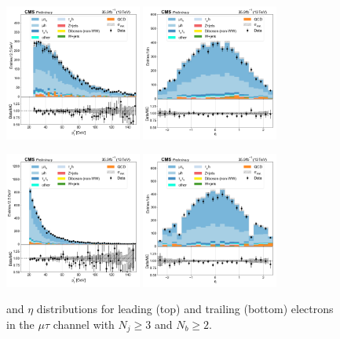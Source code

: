 \begin{figure}[htb!]
    \centering
    \includegraphics[width=0.4\textwidth]{chapters/Appendix/sectionPlots/figures/data_mc_overlays/mutau_2016_cat_gt3_gt2_signal_linear_lepton_lepton1_pt}
    \includegraphics[width=0.4\textwidth]{chapters/Appendix/sectionPlots/figures/data_mc_overlays/mutau_2016_cat_gt3_gt2_signal_linear_lepton_lepton1_eta}

    \includegraphics[width=0.4\textwidth]{chapters/Appendix/sectionPlots/figures/data_mc_overlays/mutau_2016_cat_gt3_gt2_signal_linear_lepton_lepton2_pt}
    \includegraphics[width=0.4\textwidth]{chapters/Appendix/sectionPlots/figures/data_mc_overlays/mutau_2016_cat_gt3_gt2_signal_linear_lepton_lepton2_eta}
    \caption{\pt and $\eta$ distributions for leading (top) and trailing
        (bottom) electrons in the $\mu\tau$ channel with $N_{j} \geq 3$ and
        $N_{b} \geq 2$.}
    \label{fig:mutau_8_kinematic}
\end{figure}


